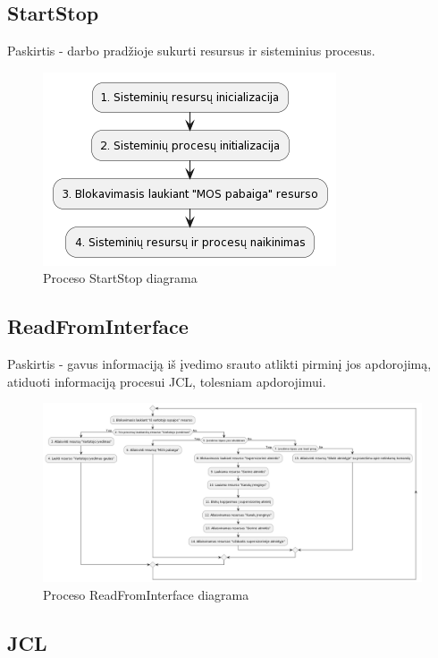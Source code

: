 \documentclass{VUMIFInfKursinis}
\begin{document}
\subsection{StartStop}

Paskirtis - darbo pradžioje sukurti resursus ir sisteminius procesus.

\begin{figure}[H]
	\centering	
	\includegraphics[scale=0.65]{img/StartStop}
	\caption{Proceso StartStop diagrama}   %
	\label{img:StartStop}
\end{figure}

\subsection{ReadFromInterface}

Paskirtis - gavus informaciją iš įvedimo srauto atlikti pirminį jos apdorojimą, atiduoti informaciją procesui JCL, tolesniam apdorojimui.

\begin{figure}[H]
	\centering	
	\includegraphics[scale=0.30]{img/ReadFromInterface}
	\caption{Proceso ReadFromInterface diagrama}   %
	\label{img:ReadFromInterface}
\end{figure}

\subsection{JCL}
\end{document}

